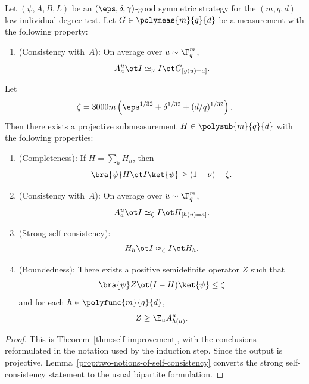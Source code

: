 \begin{theorem}\label{thm:self-improvement-in-induction-section}
  \leanok
  Let $(\psi,A,B,L)$ be an $(\eps,\delta,\gamma)$-good symmetric strategy for the $(m,q,d)$ low individual degree test. Let $G \in \polymeas{m}{q}{d}$ be a measurement with the following property:
  \begin{enumerate}
    \item (Consistency with~$A$): \label{item:si-inductive-G-consistency} On average over $u \sim \F_q^m$,
    \[
      A_a^u \ot I \simeq_\nu I \ot G_{[g(u)=a]}.
    \]
  \end{enumerate}
  Let
  \[
    \zeta = 3000m\left(\eps^{1/32}+\delta^{1/32}+(d/q)^{1/32}\right).
  \]
  Then there exists a projective submeasurement $H \in \polysub{m}{q}{d}$ with the following properties:
  \begin{enumerate}
    \item (Completeness): \label{item:si-inductive-completeness} If $H=\sum_h H_h$, then
    \[
      \bra{\psi} H \ot I \ket{\psi} \ge (1-\nu)-\zeta.
    \]
    \item (Consistency with~$A$): \label{item:si-inductive-A-consistency} On average over $u \sim \F_q^m$,
    \[
      A_a^u \ot I \simeq_\zeta I \ot H_{[h(u)=a]}.
    \]
    \item (Strong self-consistency): \label{item:si-inductive-self}
    \[
      H_h \ot I \approx_\zeta I \ot H_h.
    \]
    \item (Boundedness): \label{item:si-inductive-boundedness} There exists a positive semidefinite operator $Z$ such that
    \[
      \bra{\psi} Z \ot (I-H) \ket{\psi} \le \zeta
    \]
    and for each $h \in \polyfunc{m}{q}{d}$,
    \[
      Z \ge \E_u A_{h(u)}^u.
    \]
  \end{enumerate}
\end{theorem}
\begin{proof}
	\leanok
	This is Theorem~\ref{thm:self-improvement}, with the conclusions reformulated in the notation used by the induction step. Since the output is projective, Lemma~\ref{prop:two-notions-of-self-consistency} converts the strong self-consistency statement to the usual bipartite formulation.
\end{proof}

